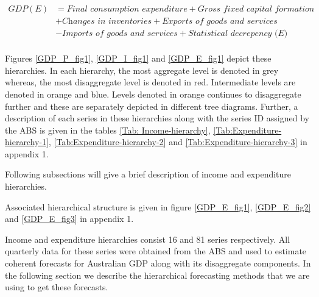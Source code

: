 \documentclass[graybox]{svmult}
\begin{document}
\begin{align*}
	GDP(E) &= \textit{Final consumption expenditure} + \textit{Gross fixed capital formation} \\ & + \textit{Changes in inventories} + \textit{Exports of goods and services} \\ & - \textit{Imports of goods and services} + \textit{Statistical decrepency (E)}\\
	\end{align*}


Figures \ref{GDP_P_fig1}, \ref{GDP_I_fig1} and \ref{GDP_E_fig1} depict these hierarchies. In each hierarchy, the most aggregate level is denoted in grey whereas, the most disaggregate level is denoted in red.  Intermediate levels are denoted in orange and blue. Levels denoted in orange continues to disaggregate further and these are separately depicted in different tree diagrams. Further, a description of each series in these hierarchies along with the series ID assigned by the ABS is given in the tables \ref{Tab: Income-hierarchy}, \ref{Tab:Expenditure-hierarchy-1}, \ref{Tab:Expenditure-hierarchy-2} and \ref{Tab:Expenditure-hierarchy-3} in appendix 1.

Following subsections will give a brief description of income and expenditure hierarchies.



Associated hierarchical structure is given in figure \ref{GDP_E_fig1}, \ref{GDP_E_fig2} and \ref{GDP_E_fig3} in appendix 1.

Income and expenditure hierarchies consist 16 and 81 series respectively. All quarterly data for these series were obtained from the ABS and used to estimate coherent forecasts for Australian GDP along with its disaggregate components. In the following section we describe the hierarchical forecasting methods that we are using to get these forecasts.
\end{document}

